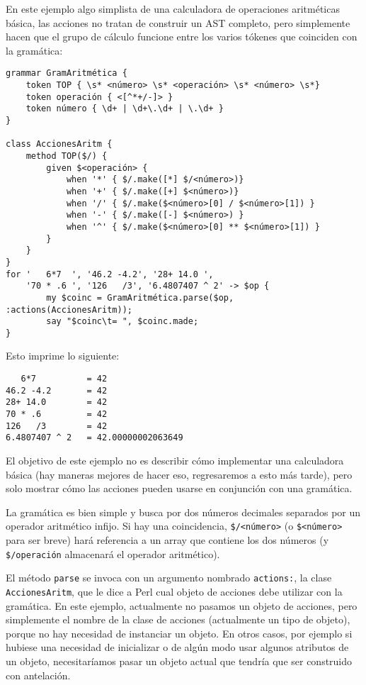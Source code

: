 En este ejemplo algo simplista de una calculadora de operaciones
aritméticas básica, las acciones no tratan de construir un AST 
completo, pero simplemente hacen que el grupo de cálculo funcione
entre los varios tókenes que coinciden con la gramática:

\begin{verbatim}
grammar GramAritmética {
    token TOP { \s* <número> \s* <operación> \s* <número> \s*}
    token operación { <[^*+/-]> }
    token número { \d+ | \d+\.\d+ | \.\d+ }
}

class AccionesAritm {
    method TOP($/) {
        given $<operación> {
            when '*' { $/.make([*] $/<número>)}
            when '+' { $/.make([+] $<número>)}
            when '/' { $/.make($<número>[0] / $<número>[1]) }
            when '-' { $/.make([-] $<número>) }
            when '^' { $/.make($<número>[0] ** $<número>[1]) }
        }
    }
}
for '   6*7  ', '46.2 -4.2', '28+ 14.0 ',
    '70 * .6 ', '126   /3', '6.4807407 ^ 2' -> $op {
        my $coinc = GramAritmética.parse($op, :actions(AccionesAritm));
        say "$coinc\t= ", $coinc.made;
}
\end{verbatim}

Esto imprime lo siguiente:

\begin{verbatim}
   6*7          = 42
46.2 -4.2       = 42
28+ 14.0        = 42
70 * .6         = 42
126   /3        = 42
6.4807407 ^ 2   = 42.00000002063649
\end{verbatim}

El objetivo de este ejemplo no es describir cómo implementar una
calculadora básica (hay maneras mejores de hacer eso, regresaremos
a esto más tarde), pero solo mostrar cómo las acciones pueden usarse
en conjunción con una gramática.

La gramática es bien simple y busca por dos números decimales separados
por un operador aritmético infijo. Si hay una coincidencia, 
\verb|$/<número>| (o \verb|$<número>| para ser breve) hará referencia
a un array que contiene los dos números (y \verb|$/operación| almacenará
el operador aritmético).

El método {\tt parse} se invoca con un argumento nombrado {\tt actions:},
la clase {\tt  AccionesAritm}, que le dice a Perl cual objeto de
acciones debe utilizar con la gramática. En este ejemplo, actualmente no pasamos
un objeto de acciones, pero simplemente el nombre de la clase
de acciones (actualmente un tipo de objeto), porque no hay 
necesidad de instanciar un objeto. En otros casos, por ejemplo si
hubiese una necesidad de inicializar o de algún modo usar
algunos atributos de un objeto, necesitaríamos pasar un 
objeto actual que tendría que ser construido con antelación.

